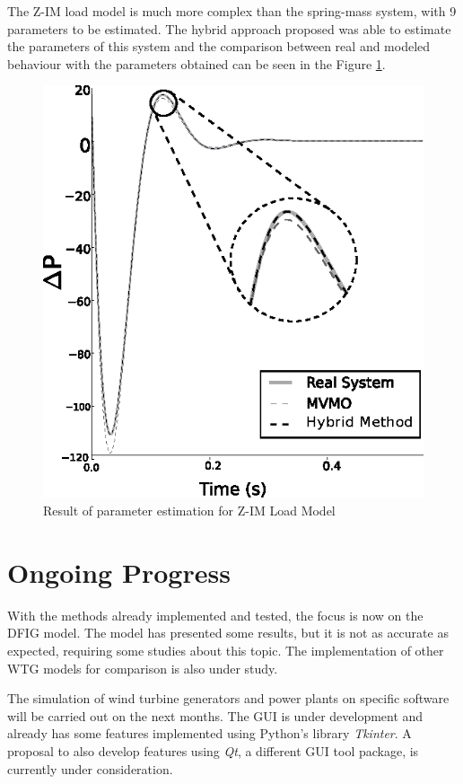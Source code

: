 The Z-IM load model is much more complex than the spring-mass system, with 9 parameters to be estimated. The hybrid approach proposed was able to estimate the parameters of this system and the comparison between real and modeled behaviour with the parameters obtained can be seen in the Figure \ref{fig: ZIM}.

\begin{figure}[h]
	\caption{Result of parameter estimation for Z-IM Load Model}
	\begin{center}
		\includegraphics[scale=1]{Images/ZIM.eps}
	\end{center}
	\label{fig: ZIM}
\end{figure}

\section{Ongoing Progress}

With the methods already implemented and tested, the focus is now on the DFIG model. The model has presented some results, but it is not as accurate as expected, requiring some studies about this topic. The implementation of other WTG models for comparison is also under study.

The simulation of wind turbine generators and power plants on specific software will be carried out on the next months. The GUI is under development and already has some features implemented using Python's library \textit{Tkinter}. A proposal to also develop features using \textit{Qt}, a different GUI tool package, is currently under consideration.